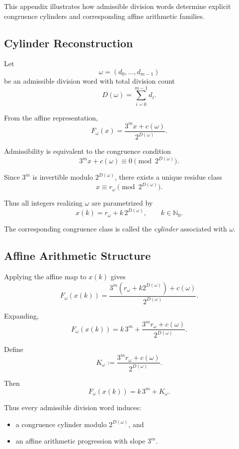 \documentclass[12pt, oneside]{article}
\numberwithin{equation}{section}
\theoremstyle{definition}
\theoremstyle{plain}
\theoremstyle{remark}
\begin{document}
This appendix illustrates how admissible division words determine
explicit congruence cylinders and corresponding affine arithmetic
families.


\subsection{Cylinder Reconstruction}

Let
\[
\omega=(d_0,\dots,d_{m-1})
\]
be an admissible division word with total division count
\[
D(\omega)=\sum_{i=0}^{m-1} d_i.
\]

From the affine representation,
\[
F_\omega(x)
=
\frac{3^m x+c(\omega)}{2^{D(\omega)}}.
\]

Admissibility is equivalent to the congruence condition
\[
3^m x+c(\omega)\equiv0\pmod{2^{D(\omega)}}.
\]

Since \(3^m\) is invertible modulo \(2^{D(\omega)}\), there exists a
unique residue class
\[
x\equiv r_\omega \pmod{2^{D(\omega)}}.
\]

Thus all integers realizing \(\omega\) are parametrized by
\[
x(k)=r_\omega+k\,2^{D(\omega)},
\qquad
k\in\mathbb N_0.
\]

The corresponding congruence class is called the
\emph{cylinder} associated with \(\omega\).


\subsection{Affine Arithmetic Structure}

Applying the affine map to \(x(k)\) gives
\[
F_\omega(x(k))
=
\frac{3^m(r_\omega+k2^{D(\omega)})+c(\omega)}
     {2^{D(\omega)}}.
\]

Expanding,
\[
F_\omega(x(k))
=
k\,3^m
+
\frac{3^m r_\omega+c(\omega)}
     {2^{D(\omega)}}.
\]

Define
\[
K_\omega
:=
\frac{3^m r_\omega+c(\omega)}
     {2^{D(\omega)}}.
\]

Then
\[
F_\omega(x(k))
=
k\,3^m+K_\omega.
\]

Thus every admissible division word induces:

\begin{itemize}
\item a congruence cylinder modulo \(2^{D(\omega)}\), and
\item an affine arithmetic progression with slope \(3^m\).
\end{itemize}
\end{document}
